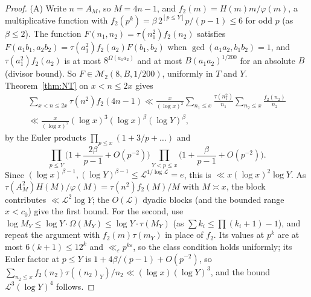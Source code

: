 \documentclass[11pt,reqno]{amsart}
\theoremstyle{definition}
\newcommand{\Lc}{\mathcal L}
\newcommand{\cM}{\mathcal M}
\begin{document}
\begin{proof}
(A) Write $n=A_M$, so $M=4n-1$, and $f_2(m)=H(m)m/\varphi(m)$, a
multiplicative function with $f_2(p^k)=\beta\,2^{[p\le Y]}p/(p-1)\le6$ for odd $p$
(as $\beta\le2$).  The function $F(n_1,n_2)=\tau(n_1^2)f_2(n_2)$ satisfies
$F(a_1b_1,a_2b_2)=\tau(a_1^2)f_2(a_2)F(b_1,b_2)$ when
$\gcd(a_1a_2,b_1b_2)=1$, and $\tau(a_1^2)f_2(a_2)$ is at most
$8^{\Omega(a_1a_2)}$ and at most $B(a_1a_2)^{1/200}$ for an absolute $B$ (divisor bound).  So
$F\in\cM_2(8,B,1/200)$, uniformly in $T$ and $Y$.  Theorem~\ref{thm:NT} on
$x<n\le2x$ gives
\begin{multline*}
 \sum_{x<n\le2x}\tau(n^2)f_2(4n-1)\ll\frac x{(\log x)^2}\sum_{n_1\le x}\frac{\tau(n_1^2)}{n_1}\sum_{n_2\le x}\frac{f_2(n_2)}{n_2}\\
 \ll\frac x{(\log x)^2}(\log x)^3(\log x)^\beta(\log Y)^\beta ,
\end{multline*}
by the Euler products $\prod_{p\le x}(1+3/p+\dots)$ and
\[
 \prod_{p\le Y}\Big(1+\frac{2\beta}{p-1}+O(p^{-2})\Big)\prod_{Y<p\le x}\Big(1+\frac\beta{p-1}+O(p^{-2})\Big).
\]
Since $(\log x)^{\beta-1},(\log Y)^{\beta-1}\le\Lc^{1/\log\Lc}=e$, this is
$\ll x(\log x)^2\log Y$.  As $\tau(A_M^2)H(M)/\varphi(M)=\tau(n^2)f_2(M)/M$ with
$M\asymp x$, the block contributes $\ll\Lc^2\log Y$; the $O(\Lc)$ dyadic blocks
(and the bounded range $x<c_0$) give the first bound.  For the second, use
$\log M_Y\le\log Y\cdot\Omega(M_Y)\le\log Y\cdot\tau(M_Y)$ (as
$\sum k_i\le\prod(k_i+1)-1$), and repeat the argument with $f_2(m)\tau(m_Y)$ in
place of $f_2$.  Its values at $p^k$ are at most $6(k+1)\le12^k$ and
$\ll_\varepsilon p^{k\varepsilon}$, so the class condition holds uniformly; its Euler
factor at $p\le Y$ is $1+4\beta/(p-1)+O(p^{-2})$, so
$\sum_{n_2\le x}f_2(n_2)\tau((n_2)_Y)/n_2\ll(\log x)(\log Y)^3$, and the bound
$\Lc^3(\log Y)^4$ follows.


\end{proof}
\end{document}
